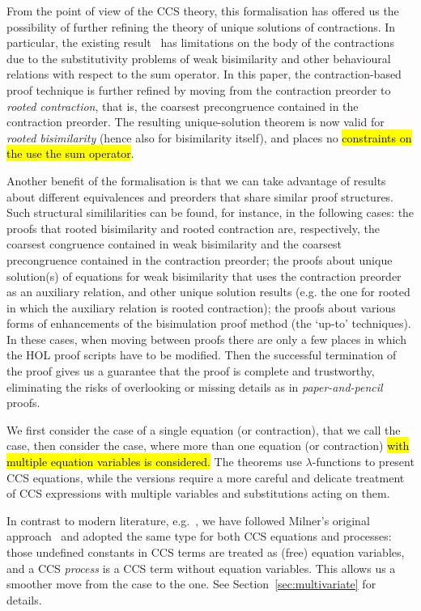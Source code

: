 From the point of view of the CCS theory, this formalisation has offered us the possibility of
further refining the theory of unique solutions of contractions.
In particular, the existing result~\cite{sangiorgi2017equations} has limitations on the body of the contractions due to the
substitutivity problems of weak bisimilarity and other behavioural relations with respect
to the sum operator.
In this paper, the contraction-based proof technique is further
refined by moving from the contraction preorder to
\emph{rooted contraction}, that is, the coarsest precongruence contained in the contraction
preorder. The resulting unique-solution theorem is now valid for
\emph{rooted bisimilarity} (hence also for bisimilarity itself), and places no 
\hl{constraints on the use the sum operator}.

Another benefit of the formalisation is 
that we can take advantage of results about different 
equivalences and preorders that share similar proof structures.
Such structural simililarities can be found, for instance, in the
following cases: the proofs that rooted bisimilarity and rooted
contraction are, respectively, the coarsest congruence contained in
weak bisimilarity and the coarsest precongruence contained in the
contraction preorder; the proofs about unique solution(s) of equations
for weak bisimilarity that uses the contraction preorder as an
auxiliary relation, and other unique solution results (e.g. the one
for rooted in which the auxiliary relation is rooted contraction); the
proofs about various forms of enhancements of the bisimulation proof
method (the `up-to' techniques).
%
In these cases, when moving between proofs there are only a few places in
which the HOL proof scripts have to be modified.
Then the successful termination of the proof gives us a guarantee that the proof is
complete and trustworthy, eliminating the risks 
of overlooking or missing details as in \emph{paper-and-pencil} proofs.

We first consider the case of a single equation (or contraction),
that we call the \univariate case, then consider the \multivariate
  case, where  more than one equation
  (or contraction) \hl{with multiple equation variables is considered.}
The \univariate theorems use
$\lambda$-functions to present CCS equations,
while the \multivariate versions require a
more careful and delicate treatment of CCS
expressions with multiple variables and substitutions acting on them.

In contrast to modern literature, e.g.~\cite{Gorrieri:2015jt},
we have followed Milner's original approach~\cite{milner1990operational} and adopted the same
type for both CCS equations and processes: those undefined constants
in CCS terms are treated as  (free) equation variables, and a CCS
\emph{process} is a CCS term without equation variables. 
This allows us a smoother move from the \univariate case to the \multivariate
one. See Section~\ref{sec:multivariate} for  details.

